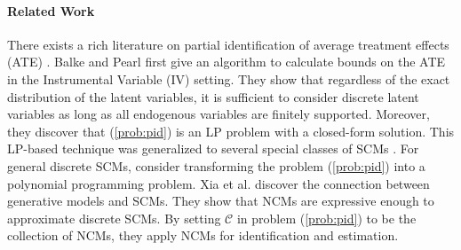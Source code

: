 \documentclass[12pt]{article}
\theoremstyle{plain}
\theoremstyle{definition}
\theoremstyle{remark}
\begin{document}
\paragraph{Related Work}\label{sec:related_work}
There exists a rich literature on partial identification of average treatment effects (ATE) \cite{manski1990nonparametric,balkeCounterfactualProbabilitiesComputational1994,balkeBoundsTreatmentEffects1997,heckmanInstrumentalVariablesSelection2001,ramsahaiCausalBoundsObservable2012,richardsonNonparametricBoundsSensitivity2014,milesPartialIdentificationPure2015,bonetInstrumentalityTestsRevisited2013,zhangBoundingCausalEffects2021,zhangPartialCounterfactualIdentification2021a,duarteAutomatedApproachCausal2021,bellot2023towards,melnychukPartialCounterfactualIdentification2023a,han2024computational}. 
Balke and Pearl \cite{balkeCounterfactualProbabilitiesComputational1994,balkeBoundsTreatmentEffects1997} first give an algorithm to calculate bounds on the ATE in the Instrumental Variable (IV) setting. They show that regardless of the exact distribution of the latent variables, it is sufficient to consider discrete latent variables as long as all endogenous variables are finitely supported. Moreover, they discover that (\ref{prob:pid}) is an LP problem with a closed-form solution. This LP-based technique was generalized to several special classes of SCMs \cite{ramsahaiCausalBoundsObservable2012,bonetInstrumentalityTestsRevisited2013,heckmanInstrumentalVariablesSelection2001,sachsGeneralMethodDeriving2021}.
For general
discrete SCMs, \cite{duarteAutomatedApproachCausal2021,zhangPartialCounterfactualIdentification2021a,zhangNonparametricMethodsPartial2021} consider transforming the problem (\ref{prob:pid}) into a polynomial programming problem. Xia et al. \cite{xiaCausalNeuralConnectionExpressiveness2022} discover the connection between generative models and SCMs. They show that NCMs are expressive enough to approximate discrete SCMs. By setting $\mathcal{C}$ in problem (\ref{prob:pid}) to be the collection of NCMs, they apply NCMs for identification and estimation.
\end{document}
